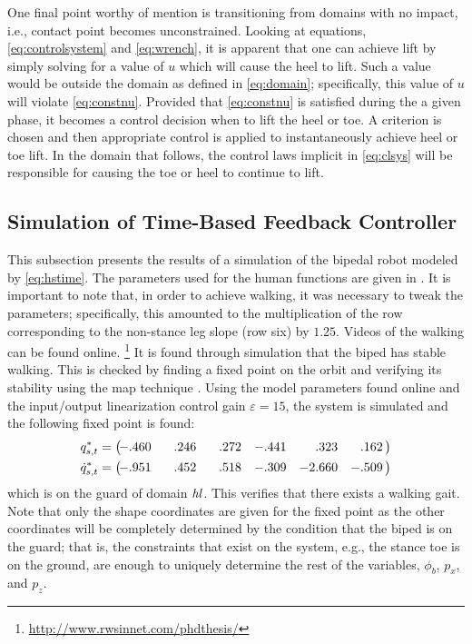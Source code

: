 \begin{remark}
  One final point worthy of mention is transitioning from domains with no
  impact, i.e., contact point becomes unconstrained.
  Looking at equations, \eqref{eq:controlsystem} and \eqref{eq:wrench}, it is
  apparent that one can achieve lift by simply solving for a value of $u$ which
  will cause the heel to lift.
  Such a value would be outside the domain as defined in \eqref{eq:domain};
  specifically, this value of $u$ will violate \eqref{eq:constnu}.
  Provided that \eqref{eq:constnu} is satisfied during the a given phase, it
  becomes a control decision when to lift the heel or toe.
  A criterion is chosen and then appropriate control is applied to
  instantaneously achieve heel or toe lift.
  In the domain that follows, the control laws implicit in \eqref{eq:clsys} will
  be responsible for causing the toe or heel to continue to lift.
\end{remark}

\subsection{Simulation of Time-Based Feedback Controller} \label{sec:timesim}

This subsection presents the results of a simulation of the bipedal robot
modeled by \eqref{eq:hstime}.
%
The parameters used for the human functions are given in .
%
It is important to note that, in order to achieve walking, it was necessary to
tweak the parameters;
%
specifically, this amounted to the multiplication of the row corresponding to
the non-stance leg slope (row six) by $1.25$.
%
Videos of the walking can be found online.%
%
\footnote{\url{http://www.rwsinnet.com/phdthesis/}\label{fn:rwsinnet}}\xspace
%
It is found through simulation that the biped has stable walking.
%
This is checked by finding a fixed point on the orbit and verifying its
stability using the \Poincare{} map technique \cite{Parker1989}.
%
Using the model parameters found online and the
input/output linearization control gain $\varepsilon = 15$, the system is
simulated and the following fixed point is found:
%
\begin{align}
  q_{s,t}^{*} =
  \left(\!\!\!\!\begin{array}{c c c c c c}
    -.460 & \hphantom{-}.246 & \hphantom{-}.272 & -.441 & \hphantom{-0}.323 &
    \hphantom{-}.162
  \end{array}\!\!\right)\\
  {\dot q}_{s,t}^{*} =
  \left(\!\!\!\!\begin{array}{c c c c c c}
    -.951 & \hphantom{-}.452 & \hphantom{-}.518 & -.309 & -2.660 & -.509
  \end{array}\!\!\right)
\end{align}
which is on the guard of domain $\mathit{hl}$.
%
This verifies that there exists a walking gait.
%
Note that only the shape coordinates are given for the fixed point as the other
coordinates will be completely determined by the condition that the biped is on
the guard;
%
that is, the constraints that exist on the system, e.g., the stance toe is on
the ground, are enough to uniquely determine the rest of the variables,
$\phi_b$, $p_x$, and $p_z$.

